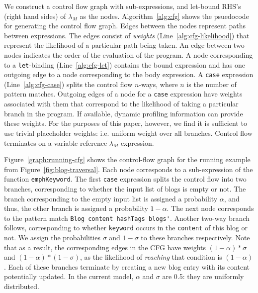 \documentclass[acmsmall,review,anonymous]{acmart}\settopmatter{printfolios=true,printccs=false,printacmref=false}
\newcommand{\new}[1]{{\color{very-dark-green}{#1}}}
\newcommand{\new}[1]{#1}
\newcommand{\Figref}[1]{Figure~\ref{#1}\xspace}
\newcommand{\figref}[1]{Figure~\ref{#1}\xspace}
\newcommand{\il}[1]{\lstinline[style=inline,mathescape=true];#1;}
\newcommand{\systemlang}[0]{\ensuremath{\lambda_{M}}}
\begin{document}
We construct a control flow graph with sub-expressions, and let-bound RHS's (right hand sides) of \systemlang{} as the nodes.
Algorithm~\ref{alg:cfg} shows the psuedocode for generating the control flow graph.
\new{Because the syntax is flattened into A-normal form, there is no need to traverse within the RHS of a let expression.}
Edges between the nodes represent paths between expressions. The edges consist of {\em weights} (Line~\ref{alg:cfg-likelihood})
that represent the likelihood of a particular path being taken.
An edge between two nodes indicates the order of the evaluation of the program.
A node corresponding to a \il{let}-binding (Line~\ref{alg:cfg-let}) contains the bound expression
and has one outgoing edge to a node corresponding to the body expression.
A \il{case} expression (Line~\ref{alg:cfg-case}) splits the control flow $n$-ways,
where $n$ is the number of pattern matches.
{Outgoing edges of a node for a \il{case} expression have weights
  associated with them that correspond to the likelihood of taking a
  particular branch in the program.}
If available, dynamic profiling information can provide these weights.
For the purposes of this paper, however, we find it is sufficient to use trivial placeholder weights: i.e. uniform weight over all branches. 
Control flow terminates on a variable reference \systemlang{} expression.






\Figref{graph:running-cfg} shows the control-flow graph for the running example from \figref{fig:blog-traversal}.
{Each node corresponds to a sub-expression of the function \il{emphKeyword}.
The first \il{case} expression splits the control flow into two branches,
corresponding to whether the input list of blogs is empty or not.
The branch corresponding to the empty input list is assigned a probability $\alpha$, and thus,
the other branch is assigned a probability $1 - \alpha$.
The next node corresponds to the pattern match \il{Blog content hashTags blogs'}.
Another two-way branch follows, corresponding to whether \il{keyword} occurs in
the \il{content} of this blog or not.
We assign the probabilities $\sigma$ and $1-\sigma$ to these branches respectively.
Note that as a result, the corresponding edges in the CFG have weights $(1 - \alpha)*\sigma$ and $(1 - \alpha)*(1 - \sigma)$, as the likelihood of {\em reaching} that condition is $(1 - \alpha)$.
Each of these branches terminate by creating a new blog entry with its content potentially updated.
In the current model, $\alpha$ and $\sigma$ are 0.5: they are uniformly distributed.
}
\end{document}
